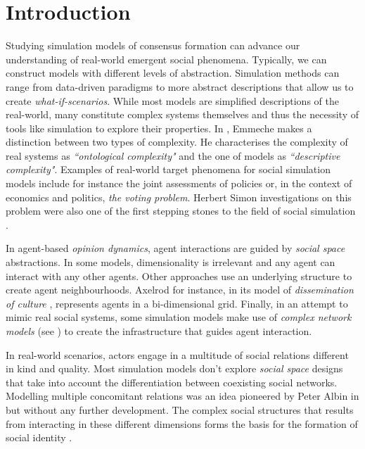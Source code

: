 \documentclass[preprint,number]{elsarticle}
\begin{document}
	\section{Introduction}
	\label{sec:introduction}
	Studying simulation models of consensus formation can advance our understanding of real-world emergent social phenomena. Typically, we can construct models with different levels of abstraction. Simulation methods can range from data-driven paradigms to more abstract descriptions that allow us to create \textit{what-if-scenarios}. While most models are simplified descriptions of the real-world, many constitute complex systems themselves and thus the necessity of tools like simulation to explore their properties. In \cite{Emmeche1997}, Emmeche makes a distinction between two types of complexity. He characterises the complexity of real systems as \textit{``ontological complexity"} and the one of models as \textit{``descriptive complexity"}. Examples of real-world target phenomena for social simulation models include for instance the joint assessments of policies or, in the context of economics and politics, \textit{the voting problem}. Herbert Simon investigations on this problem were also one of the first stepping stones to the field of social simulation \cite{Simon1954}.
	
	In agent-based \textit{opinion dynamics}, agent interactions are guided by \textit{social space} abstractions. In some models, dimensionality is irrelevant and any agent can interact with any other agents.
	Other approaches use an underlying structure to create agent neighbourhoods. Axelrod for instance, in its model of \textit{dissemination of culture} \cite{Axelrod1997}, represents agents in a bi-dimensional grid. Finally, in an attempt to mimic real social systems, some simulation models make use of \textit{complex network models} (see \cite{Weisbuch2004}) to create the infrastructure that guides agent interaction.
	
	In real-world scenarios, actors engage in a multitude of social relations different in kind and quality. Most simulation models don't explore \textit{social space} designs that take into account the differentiation between coexisting social networks. Modelling multiple concomitant relations was an idea pioneered by Peter Albin in \cite{Albin1975} but without any further development. The complex social structures that results from interacting in these different dimensions forms the basis for the formation of social identity \cite{Roccas2002,Ellemers2002}.
	
\end{document}
